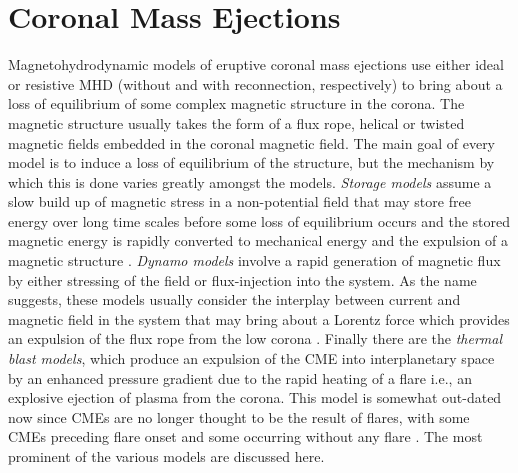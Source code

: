 

\section{Coronal Mass Ejections}\label{sec:2}

Magnetohydrodynamic models of eruptive coronal mass ejections use either ideal or resistive MHD (without and with reconnection, respectively) to bring about a loss of equilibrium of some complex magnetic structure in the corona. The magnetic structure usually takes the form of a flux rope, helical or twisted magnetic fields embedded in the coronal magnetic field. The main goal of every model is to induce a loss of equilibrium of the structure, but the mechanism by which this is done varies greatly amongst the models. {\it Storage models} assume a slow build up of magnetic stress in a non-potential field that may store free energy over long time scales before some loss of equilibrium occurs and the stored magnetic energy is rapidly converted to mechanical energy and the expulsion of a magnetic structure \citep{wolfson1998, forbes1995, antiochos1999}. {\it Dynamo models} involve a rapid generation of magnetic flux by either stressing of the field or flux-injection into the system. As the name suggests, these models usually consider the interplay between current and magnetic field in the system that may bring about a Lorentz force which provides an expulsion of the flux rope from the low corona \citep{chen1989, krall2001, schrijver2008, fan2005}. Finally there are the {\it thermal blast models}, which produce an expulsion of the CME into interplanetary space by an enhanced pressure gradient due to the rapid heating of a flare i.e., an explosive ejection of plasma from the corona.  This model is somewhat out-dated now since CMEs are no longer thought to be the result of flares, with some CMEs preceding flare onset and some occurring without any flare \citep{gosling1993}. The most prominent of the various models are discussed here.

